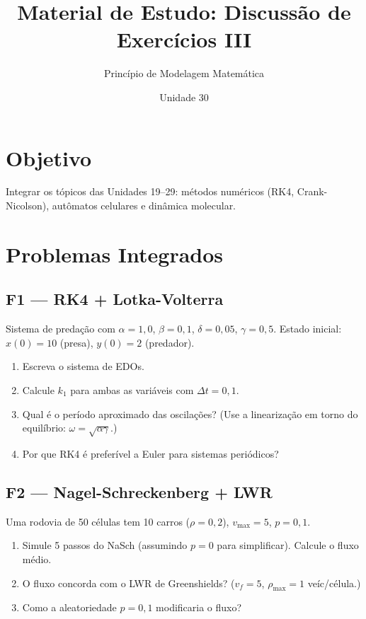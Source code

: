\documentclass[12pt,a4paper]{article}
\title{Material de Estudo: Discuss\~ao de Exerc\'icios III}
\author{Princ\'ipio de Modelagem Matem\'atica}
\date{Unidade 30}
\begin{document}
\maketitle

\section*{Objetivo}
Integrar os t\'opicos das Unidades 19--29: m\'etodos num\'ericos (RK4, Crank-Nicolson), aut\^omatos celulares e din\^amica molecular.

\section*{Problemas Integrados}

\subsection*{F1 --- RK4 + Lotka-Volterra}
Sistema de preda\c{c}\~ao com $\alpha=1{,}0$, $\beta=0{,}1$, $\delta=0{,}05$, $\gamma=0{,}5$. Estado inicial: $x(0)=10$ (presa), $y(0)=2$ (predador).
\begin{enumerate}
  \item[$a.$] Escreva o sistema de EDOs.
  \item[$b.$] Calcule $k_1$ para ambas as vari\'aveis com $\Delta t=0{,}1$.
  \item[$c.$] Qual \'e o per\'iodo aproximado das oscila\c{c}\~oes? (Use a lineariza\c{c}\~ao em torno do equil\'ibrio: $\omega = \sqrt{\alpha\gamma}$.)
  \item[$d.$] Por que RK4 \'e prefer\'ivel a Euler para sistemas peri\'odicos?
\end{enumerate}

\subsection*{F2 --- Nagel-Schreckenberg + LWR}
Uma rodovia de 50 c\'elulas tem 10 carros ($\rho=0{,}2$), $v_\text{max}=5$, $p=0{,}1$.
\begin{enumerate}
  \item[$a.$] Simule 5 passos do NaSch (assumindo $p=0$ para simplificar). Calcule o fluxo m\'edio.
  \item[$b.$] O fluxo concorda com o LWR de Greenshields? ($v_f=5$, $\rho_\text{max}=1$ ve\'ic/c\'elula.)
  \item[$c.$] Como a aleatoriedade $p=0{,}1$ modificaria o fluxo?
\end{enumerate}
\end{document}
